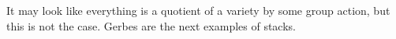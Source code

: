 
It may look like everything is a quotient of a variety by some group action, but this is not the case. Gerbes are the next examples of stacks.



